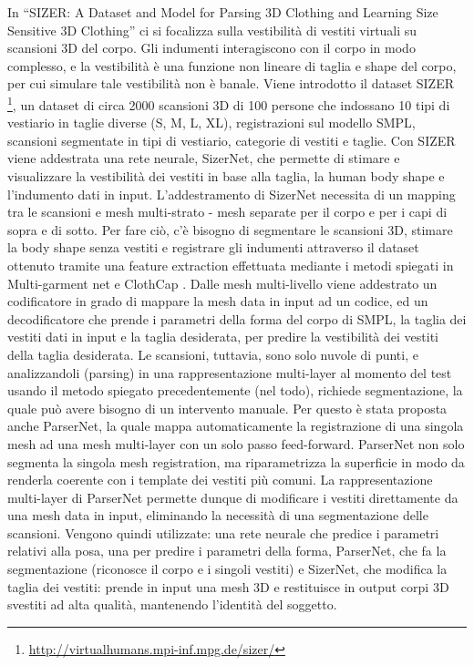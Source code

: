 In “SIZER: A Dataset and Model for Parsing 3D Clothing and Learning Size Sensitive 3D Clothing” \cite{tiwari2020sizer} ci si focalizza sulla vestibilità di vestiti virtuali su scansioni 3D del corpo. Gli indumenti interagiscono con il corpo in modo complesso, e la vestibilità è una funzione non lineare di taglia e shape del corpo, per cui simulare tale vestibilità non è banale. Viene introdotto il dataset SIZER \footnote{\url{http://virtualhumans.mpi-inf.mpg.de/sizer/}}, un dataset di circa 2000 scansioni 3D di 100 persone che indossano 10 tipi di vestiario in taglie diverse (S, M, L, XL), registrazioni sul modello SMPL, scansioni segmentate in tipi di vestiario, categorie di vestiti e taglie.
Con SIZER viene addestrata una rete neurale, SizerNet, che permette di stimare e visualizzare la vestibilità dei vestiti in base alla taglia, la human body shape e l’indumento dati in input. L’addestramento di SizerNet necessita di un mapping tra le scansioni e mesh multi-strato - mesh separate per il corpo e per i capi di sopra e di sotto. Per fare ciò, c’è bisogno di segmentare le scansioni 3D, stimare la body shape senza vestiti e registrare gli indumenti attraverso il dataset ottenuto tramite una feature extraction effettuata mediante i metodi spiegati in  Multi-garment net\cite{bhatnagar2019multi}  e ClothCap \cite{pons2017clothcap}.
Dalle mesh multi-livello viene addestrato un codificatore in grado di mappare la mesh data in input ad un codice, ed un decodificatore che prende i parametri della forma del corpo di SMPL, la taglia dei vestiti dati in input e la taglia desiderata, per predire la vestibilità dei vestiti della taglia desiderata. Le scansioni, tuttavia, sono solo nuvole di punti, e analizzandoli (parsing) in una rappresentazione multi-layer al momento del test usando il metodo spiegato precedentemente (nel todo), richiede segmentazione, la quale può avere bisogno di un intervento manuale. Per questo è stata proposta anche ParserNet, la quale mappa automaticamente la registrazione di una singola mesh ad una mesh multi-layer con un solo passo feed-forward. ParserNet non solo segmenta la singola mesh registration, ma riparametrizza la superficie in modo da renderla coerente con i template dei vestiti più comuni.
La rappresentazione multi-layer di ParserNet permette dunque di modificare i vestiti direttamente da una mesh data in input, eliminando la necessità di una segmentazione delle scansioni.
Vengono quindi utilizzate: una rete neurale che predice i parametri relativi alla posa, una per predire i parametri della forma, ParserNet, che fa la segmentazione (riconosce il corpo e i singoli vestiti) e SizerNet, che modifica la taglia dei vestiti: prende in input una mesh 3D e restituisce in output corpi 3D svestiti ad alta qualità, mantenendo l’identità del soggetto.


